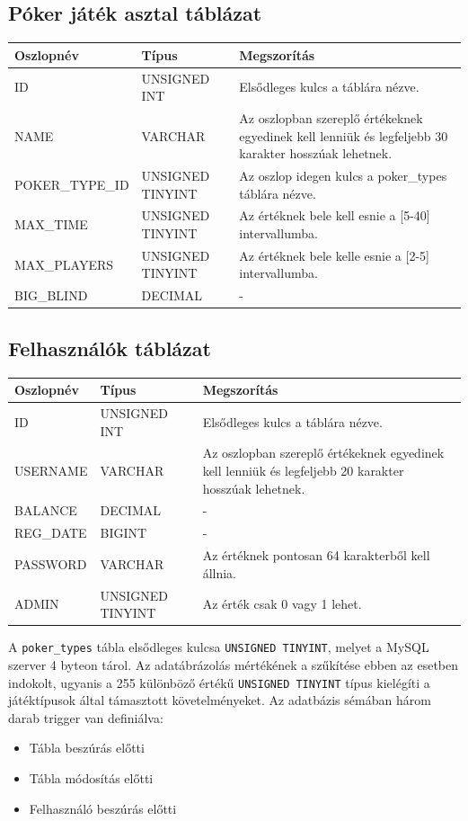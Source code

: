 \subsection{Póker játék asztal táblázat}
\begin{tabular}{| C{3.8cm} | C{4.2cm} | C{6.1cm} |}
\hline
 \textbf{Oszlopnév} & \textbf{Típus} & \textbf{Megszorítás} \\ \hline
  ID & UNSIGNED INT & Elsődleges kulcs a táblára nézve. \\ \hline
  NAME & VARCHAR & Az oszlopban szereplő értékeknek egyedinek kell lenniük és legfeljebb 30 karakter hosszúak lehetnek.  \\ \hline
  POKER\_TYPE\_ID & UNSIGNED TINYINT & Az oszlop idegen kulcs a poker\_types táblára nézve. \\ \hline
  MAX\_TIME & UNSIGNED TINYINT & Az értéknek bele kell esnie a [5-40] intervallumba. \\ \hline
  MAX\_PLAYERS & UNSIGNED TINYINT & Az értéknek bele kelle esnie a [2-5] intervallumba. \\ \hline
  BIG\_BLIND & DECIMAL & - \\ \hline
\end{tabular}

\subsection{Felhasználók táblázat}
\begin{tabular}{| C{3.8cm} | C{4.2cm} | C{6.1cm} |}
\hline
 \textbf{Oszlopnév} & \textbf{Típus} & \textbf{Megszorítás} \\ \hline
  ID & UNSIGNED INT & Elsődleges kulcs a táblára nézve. \\ \hline
  USERNAME & VARCHAR & Az oszlopban szereplő értékeknek egyedinek kell lenniük és legfeljebb 20 karakter hosszúak lehetnek.  \\ \hline
  BALANCE & DECIMAL & - \\ \hline
  REG\_DATE & BIGINT & - \\ \hline
  PASSWORD & VARCHAR & Az értéknek pontosan 64 karakterből kell állnia. \\ \hline
  ADMIN & UNSIGNED TINYINT & Az érték csak 0 vagy 1 lehet. \\ \hline
\end{tabular}

\hfill \break

A \texttt{poker\_types} tábla elsődleges kulcsa \texttt{UNSIGNED TINYINT}, melyet a MySQL szerver 4 byteon tárol. Az adatábrázolás mértékének a szűkítése ebben az esetben indokolt, ugyanis a 255 különböző értékű \texttt{UNSIGNED TINYINT} típus kielégíti a játéktípusok által támasztott követelményeket. Az adatbázis sémában három darab trigger van definiálva:
\begin{itemize}
\item Tábla beszúrás előtti
\item Tábla módosítás előtti
\item Felhasználó beszúrás előtti
\end{itemize}


